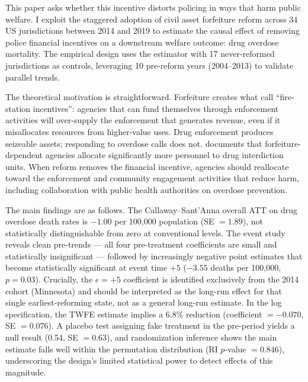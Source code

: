 \documentclass[12pt]{article}
\begin{document}
This paper asks whether this incentive distorts policing in ways that harm public welfare. I exploit the staggered adoption of civil asset forfeiture reform across 34 US jurisdictions between 2014 and 2019 to estimate the causal effect of removing police financial incentives on a downstream welfare outcome: drug overdose mortality. The empirical design uses the \citet{callaway2021difference} estimator with 17 never-reformed jurisdictions as controls, leveraging 10 pre-reform years (2004--2013) to validate parallel trends.

The theoretical motivation is straightforward. Forfeiture creates what \citet{baicker2001fire} call ``fire-station incentives'': agencies that can fund themselves through enforcement activities will over-supply the enforcement that generates revenue, even if it misallocates resources from higher-value uses. Drug enforcement produces seizeable assets; responding to overdose calls does not. \citet{holcomb2018civil} documents that forfeiture-dependent agencies allocate significantly more personnel to drug interdiction units. When reform removes the financial incentive, agencies should reallocate toward the enforcement and community engagement activities that reduce harm, including collaboration with public health authorities on overdose prevention.

The main findings are as follows. The Callaway--Sant'Anna overall ATT on drug overdose death rates is $-1.00$ per 100,000 population (SE $= 1.89$), not statistically distinguishable from zero at conventional levels. The event study reveals clean pre-trends --- all four pre-treatment coefficients are small and statistically insignificant --- followed by increasingly negative point estimates that become statistically significant at event time $+5$ ($-3.55$ deaths per 100,000, $p = 0.03$). Crucially, the $e = +5$ coefficient is identified exclusively from the 2014 cohort (Minnesota) and should be interpreted as the long-run effect for that single earliest-reforming state, not as a general long-run estimate. In the log specification, the TWFE estimate implies a 6.8\% reduction (coefficient $= -0.070$, SE $= 0.076$). A placebo test assigning fake treatment in the pre-period yields a null result (0.54, SE $= 0.63$), and randomization inference shows the main estimate falls well within the permutation distribution (RI $p$-value $= 0.846$), underscoring the design's limited statistical power to detect effects of this magnitude.
\end{document}
